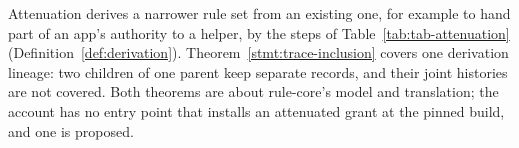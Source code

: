 Attenuation derives a narrower rule set from an existing one, for example to hand
part of an app's authority to a helper, by the  steps of
Table~\ref{tab:tab-attenuation} (Definition~\ref{def:derivation}).
Theorem~\ref{stmt:trace-inclusion} covers one derivation lineage: two children of
one parent keep separate records, and their joint histories are not covered.
Both theorems are about rule-core's model and translation; the account has no
entry point that installs an attenuated grant at the pinned build, and one is
proposed.




